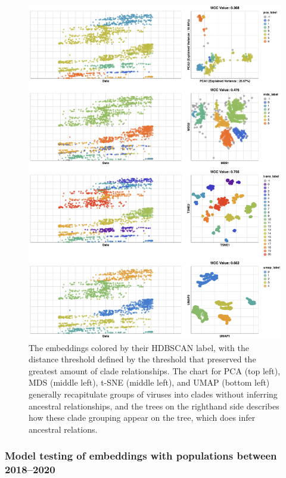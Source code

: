 \documentclass[9pt,lineno]{elife}
\begin{document}
\begin{figure}[htb]
  \begin{center}
  \includegraphics[width=\columnwidth]{fullHDBSCANChartFlu.png}
  \caption{
    The embeddings colored by their HDBSCAN label, with the distance threshold defined by the threshold that preserved the greatest amount of clade relationships.
    The chart for PCA (top left), MDS (middle left), t-SNE (middle left), and UMAP (bottom left) generally recapitulate groups of viruses into clades without inferring ancestral relationships, and the trees on the righthand side describes how these clade grouping appear on the tree, which does infer ancestral relations.
  }
  \label{fig:seasonal-influenza-h3n2-ha-clusters}
  \end{center}
\end{figure}

\subsubsection*{Model testing of embeddings with populations between 2018--2020}
\end{document}
